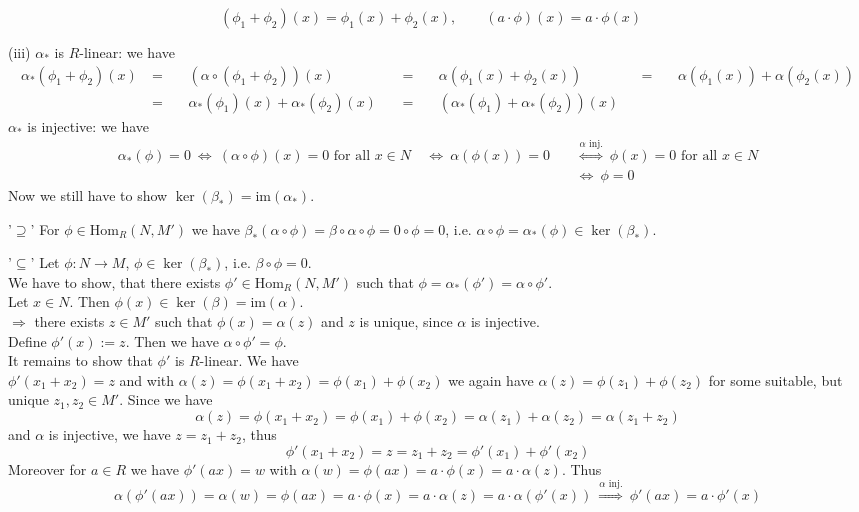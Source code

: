 \documentclass[12pt]{book}
\begin{document}
\begin{spacing}{1.3}
\begin{compactenum}
$$\left(\phi_1+\phi_2\right)(x)= \phi_1(x)+\phi_2(x), \qquad \left(a \cdot \phi\right)(x)=a \cdot \phi(x) \quad$$
\item[(iii)]
$\alpha_*$ is $R$-linear: we have
\begin{alignat*}{6}
\alpha_*(\phi_1+\phi_2)(x)\ &=&&\ \left(\alpha \circ (\phi_1+\phi_2)\right)(x)\ &&=&&\  \alpha \left(\phi_1(x)+\phi_2(x)\right)\ &&=&& \ \alpha \left(\phi_1(x)\right) + \alpha\left(\phi_2(x)\right)  \\ &=&& \ \alpha_*(\phi_1)(x)+\alpha_*(\phi_2)(x)\ &&=&& \ \left(\alpha_*(\phi_1)+ \alpha_*(\phi_2)\right)(x)
\end{alignat*}
$\alpha_*$ is injective: we have
\begin{alignat*}{5}
\alpha_*(\phi)=0 \ \Longleftrightarrow \ (\alpha \circ \phi)(x)=0 \textrm{ for all } x \in N \ &\Longleftrightarrow \ \alpha\left(\phi(x)\right)=0  \ &&\overset{\alpha \textrm{ inj.}}{\Longleftrightarrow} \ \phi(x)=0 \textrm{ for all } x \in N \\
&&& \Longleftrightarrow \ \phi=0
\end{alignat*}
Now we still have to show $\ker(\beta_*)=\textrm{im}(\alpha_*)$.
\begin{compactitem}
\item['$\supseteq$'] For $\phi \in \textrm{Hom}_R(N,M')$ we have $\beta_*(\alpha \circ \phi)= \beta \circ \alpha \circ \phi = 0 \circ \phi = 0$, i.e. $\alpha \circ \phi = \alpha_*(\phi) \in \ker(\beta_*)$.
\item['$\subseteq$'] Let $\phi:N \longrightarrow M$, $\phi \in \ker(\beta_*)$, i.e. $\beta \circ \phi=0$. \\
We have to show, that there exists $\phi' \in \textrm{Hom}_R(N,M')$ such that $\phi=\alpha_*(\phi')=\alpha \circ \phi'$.\\
Let $x \in N$. Then $\phi(x) \in \ker(\beta)=\textrm{im}(\alpha)$.\\
$\Rightarrow$ there exists $z \in M'$ such that $\phi(x)=\alpha(z)$ and $z$ is unique, since $\alpha$ is injective.\\
Define $\phi'(x):=z$. Then we have $\alpha \circ \phi'=\phi$. \\
It remains to show that $\phi'$ is $R$-linear. We have\\
$\phi'(x_1+x_2)=z$ and with $\alpha(z)=\phi(x_1+x_2)=\phi(x_1)+\phi(x_2)$ we again have $\alpha(z)= \phi(z_1)+\phi(z_2)$ for some suitable, but unique $z_1, z_2 \in M'$. Since we have
$$\alpha(z)=\phi(x_1+x_2)= \phi(x_1)+\phi(x_2)=\alpha(z_1)+\alpha(z_2)=\alpha(z_1+z_2)$$
and $\alpha$ is injective, we have $z=z_1+z_2$, thus
$$\phi'(x_1+x_2)=z=z_1+z_2=\phi'(x_1)+\phi'(x_2)$$
Moreover for $a \in R$ we have $\phi'(ax)=w$ with $\alpha(w)=\phi(ax)=a\cdot \phi(x)=a \cdot \alpha(z)$. Thus
$$\alpha\left(\phi'(ax)\right)=\alpha(w)=\phi(ax)=a \cdot \phi(x)=a \cdot \alpha(z)=a \cdot \alpha\left(\phi'(x)\right) \ \overset{\alpha \textrm{ inj.}}{\Longrightarrow} \ \phi'(ax)=a \cdot \phi'(x)$$
\end{compactitem}
\end{compactenum}


\end{spacing}
\end{document}
